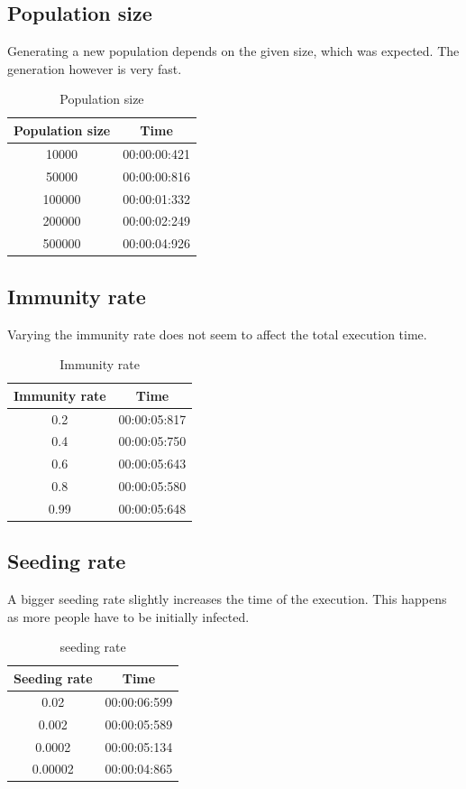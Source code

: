 \documentclass[runningheads]{llncs}
\begin{document}
\subsection{Population size}
Generating a new population depends on the given size, which was expected. The generation however is very fast.
\begin{table}[!h]
	\centering
	\begin{tabular}{|c|c|}
		\hline
		Population size & Time \\\hline
	    10000  & 00:00:00:421 \\\hline
	    50000  & 00:00:00:816 \\\hline
	    100000 & 00:00:01:332 \\\hline
 	    200000 & 00:00:02:249 \\\hline
 	    500000 & 00:00:04:926 \\
    	\hline
	\end{tabular}
	\caption{Population size}
\end{table}

\subsection{Immunity rate}
Varying the immunity rate does not seem to affect the total execution time.
\begin{table}[!h]
	\centering
	\begin{tabular}{|c|c|}
		\hline
		Immunity rate & Time \\\hline
    	0.2  & 00:00:05:817 \\\hline
    	0.4  & 00:00:05:750 \\\hline
    	0.6  & 00:00:05:643 \\\hline
    	0.8  & 00:00:05:580 \\\hline
    	0.99 & 00:00:05:648 \\
    	\hline
	\end{tabular}
	\caption{Immunity rate}
\end{table}

\subsection{Seeding rate}
A bigger seeding rate slightly increases the time of the execution. This happens as more people have to be initially infected.
\begin{table}[!h]
	\centering
	\begin{tabular}{|c|c|}
		\hline
		Seeding rate & Time \\\hline
    	0.02 	& 00:00:06:599 \\\hline
    	0.002 	& 00:00:05:589 \\\hline
    	0.0002 	& 00:00:05:134 \\\hline
  		0.00002 & 00:00:04:865 \\
    	\hline
	\end{tabular}
	\caption{seeding rate}
\end{table}
\end{document}
